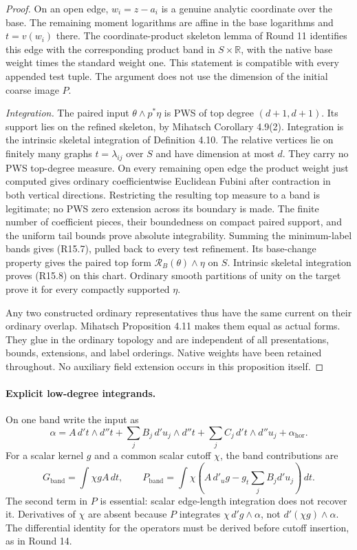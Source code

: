 \begin{proof}
On an open edge, $w_i=z-a_i$ is a genuine analytic coordinate
over the base.  The remaining moment logarithms are affine in
the base logarithms and $t=v(w_i)$ there.  The coordinate-product
skeleton lemma of Round 11 identifies this edge with the
corresponding product band in $S\times\mathbb R$, with the native
base weight times the standard weight one.  This statement is
compatible with every appended test tuple.  The argument does
not use the dimension of the initial coarse image $P$.

\emph{Integration.}
The paired input $\theta\wedge p^*\eta$ is PWS of top degree
$(d+1,d+1)$.  Its support lies on the refined skeleton, by
Mihatsch Corollary 4.9(2).  Integration is the intrinsic skeletal
integration of Definition 4.10.  The relative vertices lie on finitely
many graphs $t=\lambda_{ij}$ over $S$ and have dimension at most
$d$.  They carry no PWS top-degree measure.  On every remaining
open edge the product weight just computed gives ordinary
coefficientwise Euclidean Fubini after contraction in both
vertical directions.  Restricting the resulting top measure
to a band is legitimate; no PWS zero extension across its
boundary is made.  The finite number of coefficient pieces,
their boundedness on compact paired support, and the uniform
tail bounds prove absolute integrability.  Summing the
minimum-label bands gives (R15.7), pulled back to every test
refinement.  Its base-change property gives the paired top
form $\mathcal R_B(\theta)\wedge\eta$ on $S$.
Intrinsic skeletal integration proves (R15.8) on this chart.
Ordinary smooth partitions of unity on the target prove it
for every compactly supported $\eta$.

Any two constructed ordinary representatives thus have the same
current on their ordinary overlap.  Mihatsch Proposition 4.11
makes them equal as actual forms.  They glue in the ordinary
topology and are independent of all presentations, bounds,
extensions, and label orderings.  Native weights have been
retained throughout.  No auxiliary field extension occurs in
this proposition itself.
\end{proof}

\paragraph{Explicit low-degree integrands.}
On one band write the input as
\[
 \alpha=A\,d't\wedge d''t
   +\sum_j B_j\,d'u_j\wedge d''t
   +\sum_j C_j\,d't\wedge d''u_j+\alpha_{\mathrm{hor}}.
\]
For a scalar kernel $g$ and a common scalar cutoff $\chi$, the
band contributions are
\[
 G_{\mathrm{band}}=\int\chi gA\,dt,\qquad
 P_{\mathrm{band}}
   =\int\chi\left(A\,d'_u g-g_t\sum_j B_jd'u_j\right)\,dt.
                                                        \tag{R15.9}
\]
The second term in $P$ is essential: scalar edge-length integration
does not recover it.  Derivatives of $\chi$ are absent because
$P$ integrates $\chi\,d'g\wedge\alpha$, not
$d'(\chi g)\wedge\alpha$.  The differential identity for the
operators must be derived before cutoff insertion, as in Round 14.

